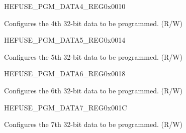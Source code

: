 \begin{register}{H}{EFUSE\_PGM\_DATA4\_REG}{0x0010}\label{regdesc:EFUSEPGMDATA4REG}
%
\regnewline%
\begin{regdesc}\begin{reglist}
\label{fielddesc:EFUSEPGMDATA4}\item [EFUSE\_PGM\_DATA\_4] Configures the 4th 32-bit data to be programmed. (R/W)
\end{reglist}\end{regdesc}
\end{register}


\begin{register}{H}{EFUSE\_PGM\_DATA5\_REG}{0x0014}\label{regdesc:EFUSEPGMDATA5REG}
%
\regnewline%
\begin{regdesc}\begin{reglist}
\label{fielddesc:EFUSEPGMDATA5}\item [EFUSE\_PGM\_DATA\_5] Configures the 5th 32-bit data to be programmed. (R/W)
\end{reglist}\end{regdesc}
\end{register}


\begin{register}{H}{EFUSE\_PGM\_DATA6\_REG}{0x0018}\label{regdesc:EFUSEPGMDATA6REG}
%
\regnewline%
\begin{regdesc}\begin{reglist}
\label{fielddesc:EFUSEPGMDATA6}\item [EFUSE\_PGM\_DATA\_6] Configures the 6th 32-bit data to be programmed. (R/W)
\end{reglist}\end{regdesc}
\end{register}


\begin{register}{H}{EFUSE\_PGM\_DATA7\_REG}{0x001C}\label{regdesc:EFUSEPGMDATA7REG}
%
\regnewline%
\begin{regdesc}\begin{reglist}
\label{fielddesc:EFUSEPGMDATA7}\item [EFUSE\_PGM\_DATA\_7] Configures the 7th 32-bit data to be programmed. (R/W)
\end{reglist}\end{regdesc}
\end{register}


